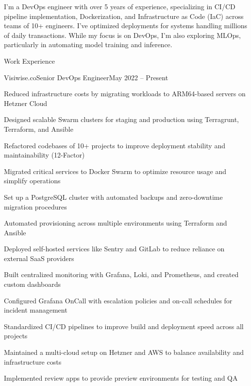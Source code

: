 \documentclass[]{main}
\begin{document}
\resumeheader
{}
{}
{}
{}
{}
{}

I'm a DevOps engineer with over 5 years of experience, specializing in CI/CD pipeline implementation, Dockerization, and Infrastructure as Code (IaC) across teams of 10+ engineers. I've optimized deployments for systems handling millions of daily transactions. While my focus is on DevOps, I'm also exploring MLOps, particularly in automating model training and inference.

\begin{section}{Work Experience}
 \begin{subsection}{Visiwise.co}{Senior DevOps Engineer}{May 2022 -- Present}{}
     \item Reduced infrastructure costs by migrating workloads to ARM64-based servers on Hetzner Cloud
     \item Designed scalable Swarm clusters for staging and production using Terragrunt, Terraform, and Ansible
     \item Refactored codebases of 10+ projects to improve deployment stability and maintainability (12-Factor)
     \item Migrated critical services to Docker Swarm to optimize resource usage and simplify operations
     \item Set up a PostgreSQL cluster with automated backups and zero-downtime migration procedures
     \item Automated provisioning across multiple environments using Terraform and Ansible
     \item Deployed self-hosted services like Sentry and GitLab to reduce reliance on external SaaS providers
     \item Built centralized monitoring with Grafana, Loki, and Prometheus, and created custom dashboards
     \item Configured Grafana OnCall with escalation policies and on-call schedules for incident management
     \item Standardized CI/CD pipelines to improve build and deployment speed across all projects
     \item Maintained a multi-cloud setup on Hetzner and AWS to balance availability and infrastructure costs
     \item Implemented review apps to provide preview environments for testing and QA
 \end{subsection}


\end{section}
\end{document}
